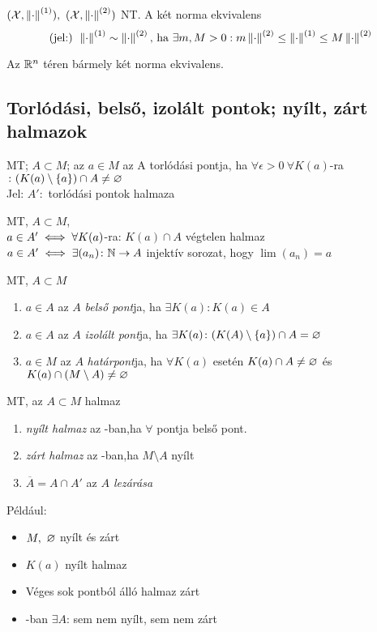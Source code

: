 \begin{de}
  $(\mathcal{X},\left\Vert \cdot\right\Vert^{(1)}),\ (\mathcal{X},\left\Vert \cdot\right\Vert^{(2)})$ NT. A két norma ekvivalens 
  \[ \text{(jel:) } \left\Vert \cdot\right\Vert^{(1)}\sim\left\Vert \cdot\right\Vert^{(2)}\text{, ha }\exists m,M>0:m\left\Vert \cdot\right\Vert^{(2)}\leq \left\Vert \cdot\right\Vert^{(1)}\leq M\left\Vert \cdot\right\Vert^{(2)}\]    
\end{de}
\begin{te}Az $\mathbb{R}^n$ téren bármely két norma ekvivalens.\end{te}

\subsection{Torlódási, belső, izolált pontok; nyílt, zárt halmazok}

\begin{de}
  \MT MT; $A\subset M$; az $a\in M$ az A torlódási pontja, ha
  $\forall \epsilon >0\  \forall K(a)$-ra$\colon (K(a)\setminus\{a\})
  \cap A \neq \varnothing$\\
  Jel: $A'\colon$ torlódási pontok halmaza
\end{de}

\begin{te}
  \MT MT, $A\subset M$,\\
  $a\in A' \iff \forall K(a)$-ra: $K(a)\cap A$ végtelen
  halmaz\\
  $a\in A' \iff \exists (a_n)\colon \mathbb{N}\to A$ injektív sorozat, hogy
  $\lim(a_n)=a$
\end{te}
\begin{de} \MT MT, $A\subset M$
  \begin{enumerate}
  \item $a\in A$ az $A$ \emph{belső pont}ja, ha $\exists K(a)\colon
    K(a)\in A$
  \item $a\in A$ az $A$ \emph{izolált pont}ja, ha $\exists
    K(a)\colon  (K(A)\setminus\{a\}) \cap A = \varnothing$
  \item $a\in M$ az $A$ \emph{határpont}ja, ha $\forall K(a)$
    esetén $K(a)\cap A \neq \varnothing$ és $K(a)\cap (M\setminus
    A) \neq \varnothing$
  \end{enumerate}
\end{de}

\begin{de} \MT MT, az $A\subset M$ halmaz
  \begin{enumerate}
  \item \emph{nyílt halmaz} az \MT-ban,ha $\forall$ pontja
    belső pont.
  \item \emph{zárt halmaz} az \MT-ban,ha $M\setminus A$ nyílt
  \item $\overline{\!A}=A\cap A'$ az \emph{$A$ lezárása}
  \end{enumerate}
\end{de}
Például:
\begin{itemize}
\item $M,\ \varnothing$ nyílt és zárt
\item $K(a)$ nyílt halmaz
\item Véges sok pontból álló halmaz zárt
\item \MT-ban $\exists A$: sem nem nyílt, sem nem zárt
\end{itemize}

